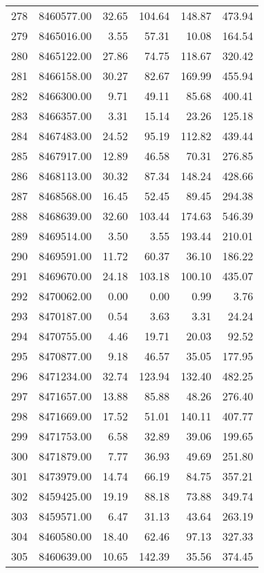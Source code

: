 \begin{table}[ht]
\begin{tabular}{rrrrrr}
  278 & 8460577.00 & 32.65 & 104.64 & 148.87 & 473.94 \\ 
  279 & 8465016.00 & 3.55 & 57.31 & 10.08 & 164.54 \\ 
  280 & 8465122.00 & 27.86 & 74.75 & 118.67 & 320.42 \\ 
  281 & 8466158.00 & 30.27 & 82.67 & 169.99 & 455.94 \\ 
  282 & 8466300.00 & 9.71 & 49.11 & 85.68 & 400.41 \\ 
  283 & 8466357.00 & 3.31 & 15.14 & 23.26 & 125.18 \\ 
  284 & 8467483.00 & 24.52 & 95.19 & 112.82 & 439.44 \\ 
  285 & 8467917.00 & 12.89 & 46.58 & 70.31 & 276.85 \\ 
  286 & 8468113.00 & 30.32 & 87.34 & 148.24 & 428.66 \\ 
  287 & 8468568.00 & 16.45 & 52.45 & 89.45 & 294.38 \\ 
  288 & 8468639.00 & 32.60 & 103.44 & 174.63 & 546.39 \\ 
  289 & 8469514.00 & 3.50 & 3.55 & 193.44 & 210.01 \\ 
  290 & 8469591.00 & 11.72 & 60.37 & 36.10 & 186.22 \\ 
  291 & 8469670.00 & 24.18 & 103.18 & 100.10 & 435.07 \\ 
  292 & 8470062.00 & 0.00 & 0.00 & 0.99 & 3.76 \\ 
  293 & 8470187.00 & 0.54 & 3.63 & 3.31 & 24.24 \\ 
  294 & 8470755.00 & 4.46 & 19.71 & 20.03 & 92.52 \\ 
  295 & 8470877.00 & 9.18 & 46.57 & 35.05 & 177.95 \\ 
  296 & 8471234.00 & 32.74 & 123.94 & 132.40 & 482.25 \\ 
  297 & 8471657.00 & 13.88 & 85.88 & 48.26 & 276.40 \\ 
  298 & 8471669.00 & 17.52 & 51.01 & 140.11 & 407.77 \\ 
  299 & 8471753.00 & 6.58 & 32.89 & 39.06 & 199.65 \\ 
  300 & 8471879.00 & 7.77 & 36.93 & 49.69 & 251.80 \\ 
  301 & 8473979.00 & 14.74 & 66.19 & 84.75 & 357.21 \\ 
  302 & 8459425.00 & 19.19 & 88.18 & 73.88 & 349.74 \\ 
  303 & 8459571.00 & 6.47 & 31.13 & 43.64 & 263.19 \\ 
  304 & 8460580.00 & 18.40 & 62.46 & 97.13 & 327.33 \\ 
  305 & 8460639.00 & 10.65 & 142.39 & 35.56 & 374.45 \\ 

\end{tabular}
\end{table}
